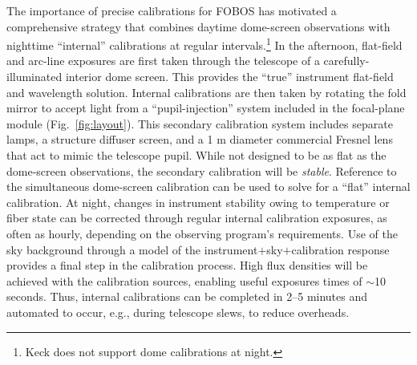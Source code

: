 \documentclass[oneside,11pt]{amsart}
\begin{document}


The importance of precise calibrations for FOBOS has motivated a comprehensive strategy that combines daytime dome-screen observations with nighttime ``internal'' calibrations at regular intervals.\footnote{Keck does not support dome calibrations at night.}  In the afternoon, flat-field and arc-line exposures are first taken through the telescope of a carefully-illuminated interior dome screen.  This provides the ``true'' instrument flat-field and wavelength solution.  Internal calibrations are then taken by rotating the fold mirror to accept light from a ``pupil-injection'' system included in the focal-plane module (Fig.~\ref{fig:layout}).  This secondary calibration system includes separate lamps, a structure diffuser screen, and a 1 m diameter commercial Fresnel lens that act to mimic the telescope pupil.  While not designed to be as flat as the dome-screen observations, the secondary calibration will be \emph{stable}.  Reference to the simultaneous dome-screen calibration can be used to solve for a ``flat'' internal calibration.  At night, changes in instrument stability owing to temperature or fiber state can be corrected through regular internal calibration exposures, as often as hourly, depending on the observing program's requirements.  Use of the sky background through a model of the instrument$+$sky$+$calibration response provides a final step in the calibration process.  High flux densities will be achieved with the calibration sources, enabling useful exposures times of $\sim$10 seconds.  Thus, internal calibrations can be completed in 2--5 minutes and automated to occur, e.g., during telescope slews, to reduce overheads.
\end{document}
